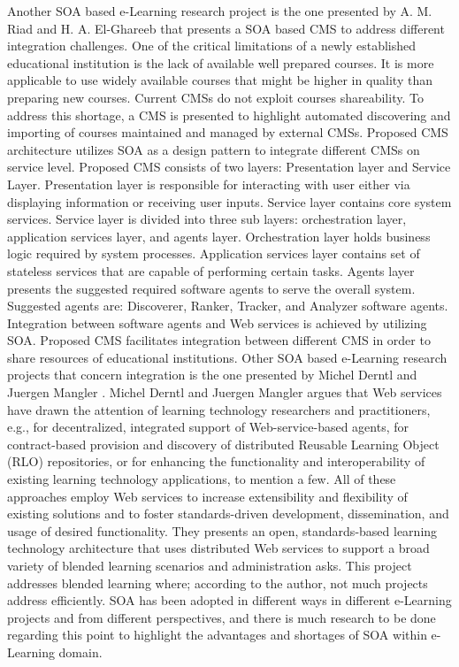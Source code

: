\documentclass[12pt,a4paper,final,twoside,onecolumn,titlepage]{book}
\begin{document}
Another \gls{SOA} based e-Learning research project is the one presented by A. M. Riad and H. A. El-Ghareeb \cite{EV09} that presents a \gls{SOA} based \gls{CMS} to address different integration challenges. One of the critical limitations of a newly established educational institution is the lack of available well prepared courses. It is more applicable to use widely available courses that might be higher in quality than preparing new courses. Current \gls{CMS}s do not exploit courses shareability. To address this shortage, a \gls{CMS} is presented to highlight automated discovering and importing of courses maintained and managed by external \gls{CMS}s. Proposed \gls{CMS} architecture utilizes \gls{SOA} as a design pattern to integrate different \gls{CMS}s on service level. Proposed \gls{CMS} consists of two layers: Presentation layer and Service Layer. Presentation layer is responsible for interacting with user either via displaying information or receiving user inputs. Service layer contains core system services. Service layer is divided into three sub layers: orchestration layer, application services layer, and agents layer. Orchestration layer holds business logic required by system processes. Application services layer contains set of stateless services that are capable of performing certain tasks. Agents layer presents the suggested required software agents to serve the overall system. Suggested agents are: Discoverer, Ranker, Tracker, and Analyzer software agents. Integration between software agents and Web services is achieved by utilizing \gls{SOA}. Proposed \gls{CMS} facilitates integration between different \gls{CMS} in order to share resources of educational institutions.
Other \gls{SOA} based e-Learning research projects that concern integration is the one presented by Michel Derntl and Juergen Mangler \cite{R63}. Michel Derntl  and Juergen Mangler  argues that Web services have drawn the attention of learning technology researchers and practitioners, e.g., for decentralized, integrated support of Web-service-based agents, for contract-based provision and discovery of distributed Reusable Learning Object (RLO) repositories, or for enhancing the functionality and interoperability of existing learning technology applications, to mention a few. All of these approaches employ Web services to increase extensibility and flexibility of existing solutions and to foster standards-driven development, dissemination, and usage of desired functionality. They presents an open, standards-based learning technology architecture that uses distributed Web services to support a broad variety of blended learning scenarios and administration asks. This project addresses blended learning where; according to the author, not much projects address efficiently. \gls{SOA} has been adopted in different ways in different e-Learning projects and from different perspectives, and there is much research to be done regarding this point to highlight the advantages and shortages of \gls{SOA} within e-Learning domain.
\end{document}
